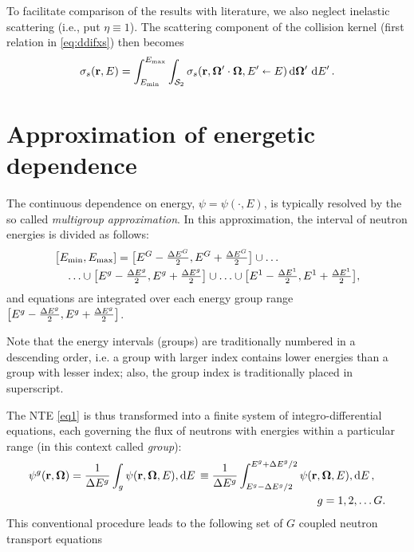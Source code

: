 To facilitate comparison of the results with literature, we also neglect inelastic scattering (i.e., put $\eta \equiv
1$). The scattering component of the collision kernel (first relation in \eqref{eq:ddifxs}) then becomes
\begin{equation}\label{eq:ddifxs2}
	\sigma_s(\br, E) =
\intE[']{\Emin}{\Emax}{\intA[']{\sigma_s(\br,\bomega'\cdot\bomega, E'\sla E)}}.
\end{equation}

\section{Approximation of energetic dependence}\label{sec:MG}

The continuous dependence on energy, $\psi = \psi(\cdot, E)$, is typically resolved by the so called \textit{multigroup
approximation}. In this approximation, the interval of neutron energies is divided as follows:
$$
\begin{multlined}
  \bigl[\Emin,\Emax] = \bigl[E^{G}-\dEh{G},E^{G}+\dEh{G}\bigr]\cup \ldots\\
  \ldots \cup \bigl[E^{g}-\dEh{g}, E^{g}+\dEh{g}\bigr] \cup \ldots \cup
  \bigl[E^1-\dEh{1},E^{1}+\dEh{1}\bigr],
\end{multlined} 
$$
and equations  are integrated over each energy group range 
\linebreak
\mbox{$\bigl[E^{g}-\dEh{g}, E^{g}+\dEh{g}\bigr]$}.
\begin{remark}
Note that the energy intervals (groups) are traditionally numbered in a descending order, i.e. a group with larger index
contains lower energies than a group with lesser index; also, the group index is traditionally placed in superscript. 
\end{remark}
The NTE \eqref{eq1} is thus transformed into a finite system of integro-differential equations, each
governing the flux of neutrons with energies within a particular range (in this context called \textit{group}):
\begin{equation}\label{eq:psi-MG}
\begin{multlined}
  \psi^g(\br, \bomega) = \frac{1}{\Delta E^{g}}\int_{g}\psi(\br, \bomega, E),\d{E} \equiv
  \frac{1}{\Delta E^{g}}\int_{E^g-\Delta E^{g}/2}^{E^g+\Delta E^{g}/2}\psi(\br, \bomega, E),\d{E},\\ g = 1, 2,\ldots
  G.
\end{multlined}
\end{equation} 
This conventional procedure leads to the following set of $G$ coupled neutron transport equations
